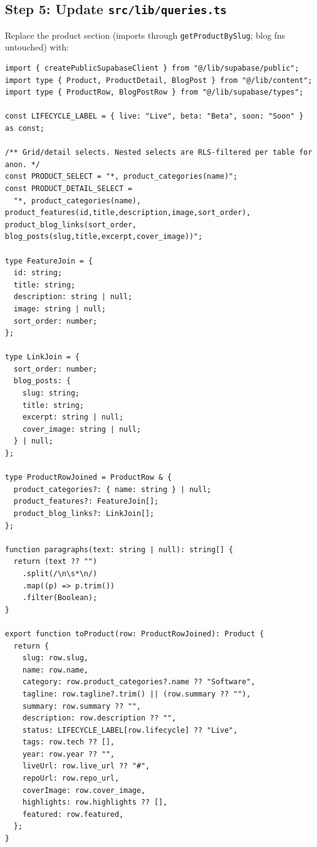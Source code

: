 \documentclass[11pt,a4paper]{article}
\begin{document}
\subsection*{Step 5: Update \texttt{src/lib/queries.ts}}

Replace the product section (imports through \texttt{getProductBySlug}; blog fns untouched) with:

\begin{lstlisting}
import { createPublicSupabaseClient } from "@/lib/supabase/public";
import type { Product, ProductDetail, BlogPost } from "@/lib/content";
import type { ProductRow, BlogPostRow } from "@/lib/supabase/types";

const LIFECYCLE_LABEL = { live: "Live", beta: "Beta", soon: "Soon" } as const;

/** Grid/detail selects. Nested selects are RLS-filtered per table for anon. */
const PRODUCT_SELECT = "*, product_categories(name)";
const PRODUCT_DETAIL_SELECT =
  "*, product_categories(name), product_features(id,title,description,image,sort_order), product_blog_links(sort_order, blog_posts(slug,title,excerpt,cover_image))";

type FeatureJoin = {
  id: string;
  title: string;
  description: string | null;
  image: string | null;
  sort_order: number;
};

type LinkJoin = {
  sort_order: number;
  blog_posts: {
    slug: string;
    title: string;
    excerpt: string | null;
    cover_image: string | null;
  } | null;
};

type ProductRowJoined = ProductRow & {
  product_categories?: { name: string } | null;
  product_features?: FeatureJoin[];
  product_blog_links?: LinkJoin[];
};

function paragraphs(text: string | null): string[] {
  return (text ?? "")
    .split(/\n\s*\n/)
    .map((p) => p.trim())
    .filter(Boolean);
}

export function toProduct(row: ProductRowJoined): Product {
  return {
    slug: row.slug,
    name: row.name,
    category: row.product_categories?.name ?? "Software",
    tagline: row.tagline?.trim() || (row.summary ?? ""),
    summary: row.summary ?? "",
    description: row.description ?? "",
    status: LIFECYCLE_LABEL[row.lifecycle] ?? "Live",
    tags: row.tech ?? [],
    year: row.year ?? "",
    liveUrl: row.live_url ?? "#",
    repoUrl: row.repo_url,
    coverImage: row.cover_image,
    highlights: row.highlights ?? [],
    featured: row.featured,
  };
}


\end{lstlisting}
\end{document}
